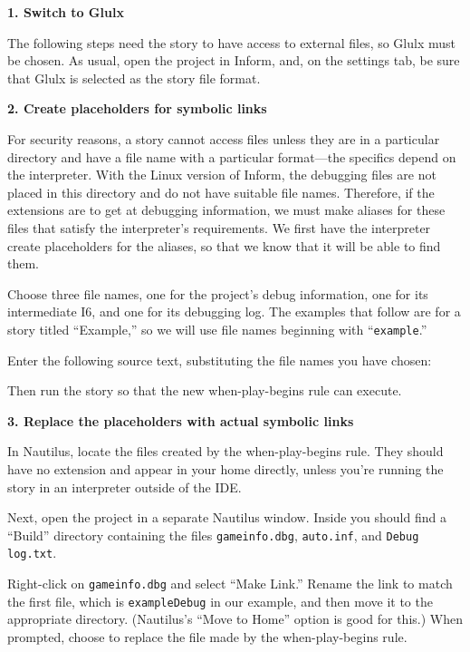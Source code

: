 \documentclass{book}
\begin{document}
\textbf{1. Switch to Glulx}

The following steps need the story to have access to external files, so Glulx
must be chosen.  As usual, open the project in Inform, and, on the settings tab,
be sure that Glulx is selected as the story file format.

\textbf{2. Create placeholders for symbolic links}

For security reasons, a story cannot access files unless they are in a
particular directory and have a file name with a particular format---the
specifics depend on the interpreter.  With the Linux version of Inform, the
debugging files are not placed in this directory and do not have suitable file
names.  Therefore, if the extensions are to get at debugging information, we
must make aliases for these files that satisfy the interpreter's requirements.
We first have the interpreter create placeholders for the aliases, so that we
know that it will be able to find them.

Choose three file names, one for the project's debug information, one for its
intermediate I6, and one for its debugging log.  The examples that follow are
for a story titled ``Example,'' so we will use file names beginning with
``\texttt{example}.''

Enter the following source text, substituting the file names you have chosen:

\begin{quote}
  
\end{quote}

Then run the story so that the new when-play-begins rule can execute.

\textbf{3. Replace the placeholders with actual symbolic links}

In Nautilus, locate the files created by the when-play-begins rule.  They should
have no extension and appear in your home directly, unless you're running the
story in an interpreter outside of the IDE.

Next, open the project in a separate Nautilus window.  Inside you should find a
``Build'' directory containing the files \texttt{gameinfo.dbg},
\texttt{auto.inf}, and \texttt{Debug log.txt}.

Right-click on \texttt{gameinfo.dbg} and select ``Make Link.''  Rename the link
to match the first file, which is \texttt{exampleDebug} in our example, and then
move it to the appropriate directory.  (Nautilus's ``Move to Home'' option is
good for this.)  When prompted, choose to replace the file made by the
when-play-begins rule.
\end{document}
